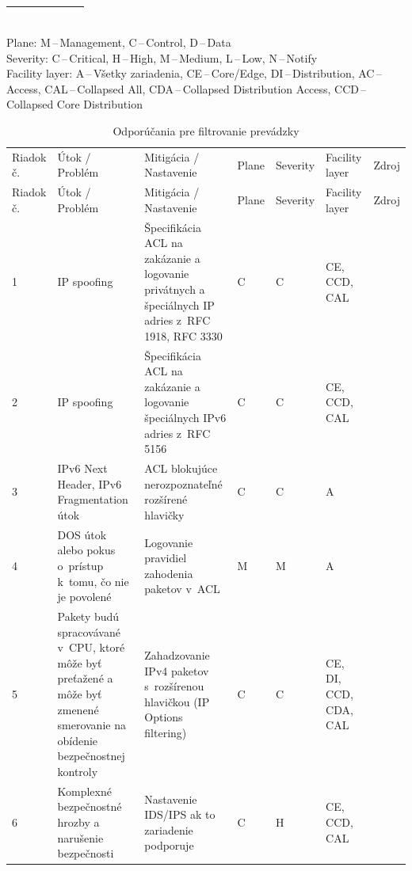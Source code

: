 \begin{longtable}[!htbp]{|C{2.5em}L{11em}L{11em}C{2.5em}C{4em}C{5em}L{2.5em}|}
	\cite{Jackson2010}
	
	\cite{CIS_DrTLsgXv24lxeIIM}\\
	
	\hline
	
\end{longtable}%
\vspace{-1em}
{\tiny 
	\noindent
	Plane: M\,--\,Management, C\,--\,Control, D\,--\,Data\\
	Severity: C\,--\,Critical, H\,--\,High, M\,--\,Medium, L\,--\,Low, N\,--\,Notify\\
	Facility layer: A\,--\,Všetky zariadenia, CE\,--\,Core/Edge, DI\,--\,Distribution, AC\,--\,Access, CAL\,--\,Collapsed All, CDA\,--\,Collapsed Distribution Access, CCD\,--\,Collapsed Core Distribution}

\begin{longtable}[!htbp]{|C{2.5em}L{11em}L{11em}C{2.5em}C{4em}C{5em}L{2.5em}|}
	\caption{Odporúčania pre filtrovanie prevádzky}
	\label{tab:filtering}\\ \hline
	\mbox{Riadok} č.&Útok / Problém	&Mitigácia / Nastavenie	&Plane	&Severity	&Facility layer	&Zdroj\\ \hhline{=======}
	\endfirsthead 
	\hline
	\centering
	
	Riadok č.	&Útok / Problém	&Mitigácia / Nastavenie	&Plane	&Severity	&Facility layer	&Zdroj\\ \hhline{=======}
	\endhead
	
	
	 1	&IP spoofing	&Špecifikácia ACL na zakázanie a logovanie privátnych a špeciálnych IP adries z~RFC 1918, RFC 3330	&C	&C	&CE,
	CCD,
	CAL	& \cite{Jackson2010}
	
	\cite{Singh2018}
	
	\cite{CIS_DrTLsgXv24lxeIIM}\\
	2	&IP spoofing	&Špecifikácia ACL na zakázanie a logovanie špeciálnych IPv6 adries z~RFC 5156	&C	&C	&CE,
	CCD,
	CAL	& \cite{Jackson2010}
	
	\cite{Singh2018}
	
	\cite{CIS_DrTLsgXv24lxeIIM}\\
	 3	&IPv6 Next Header,
	IPv6 Fragmentation útok	&ACL blokujúce nerozpoznateľné rozšírené hlavičky	&C	&C	&A	& \cite{Podermanski1922015}
	
	\cite{Gregr2622015}\\
	4	&DOS útok alebo pokus o~prístup k~tomu, čo nie je povolené	&Logovanie pravidiel zahodenia paketov v~ACL	&M	&M	&A	& \cite{Akin2002}\\
	 5	&Pakety budú spracovávané v~CPU, ktoré môže byť preťažené a môže byť zmenené smerovanie na obídenie bezpečnostnej kontroly	&Zahadzovanie IPv4 paketov s~rozšírenou hlavičkou (IP Options filtering)	&C	&C	&CE,
	DI,
	CCD,
	CDA,
	CAL	& \cite{Singh2018}\\
	6	&Komplexné bezpečnostné hrozby a narušenie bezpečnosti	&Nastavenie IDS/IPS ak to zariadenie podporuje	&C	&H	&CE, CCD,
	CAL	& \cite{Hucaby2010}\\
	\hline
\end{longtable}%
